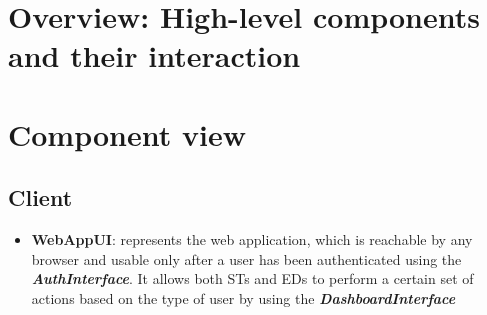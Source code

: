 \section{Overview: High-level components and their interaction}
\label{s:overview}%

\section{Component view}
\label{s:component-view}%
\subsection*{Client}
\begin{itemize}
  \item \textbf{WebAppUI}: represents the web application, which is reachable by any browser and usable only after a user has been authenticated using the \textbf{\textit{AuthInterface}}. It allows both STs and EDs to perform a certain set of actions based on the type of user by using the \textbf{\textit{DashboardInterface}}
\end{itemize}
